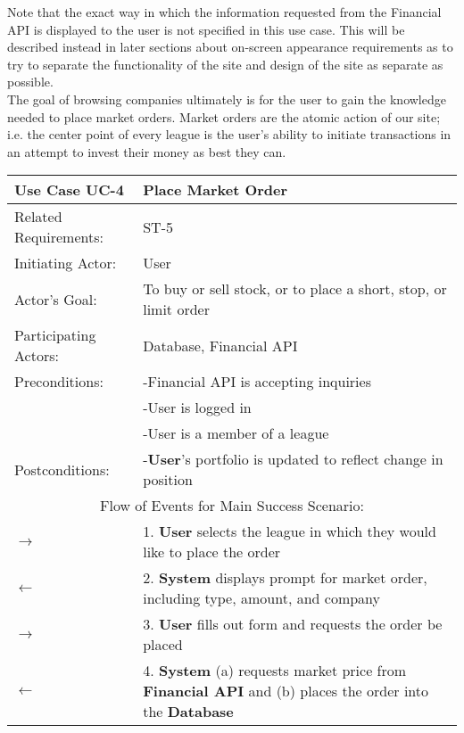 Note that the exact way in which the information requested from the Financial API is displayed to the user is not specified in this use case. This will be described instead in later sections about on-screen appearance requirements as to try to separate the functionality of the site and design of the site as separate as possible. \\

The goal of browsing companies ultimately is for the user to gain the knowledge needed to place market orders. Market orders are the atomic action of our site; i.e. the center point of every league is the user's ability to initiate transactions in an attempt to invest their money as best they can. \\

\begin{centering}
\renewcommand\arraystretch{1.3} %
\begin{longtable}{|p{1.2in} p{5in}|}
\hline
\bfseries{\color{color1}Use Case UC-4} & \bfseries{\color{color1}Place Market Order} \\
\hline
Related Requirements: & ST-5 \\ 
Initiating Actor:     & User \\
Actor's Goal:         & To buy or sell stock, or to place a short, stop, or limit order \\
Participating Actors:  & Database, Financial API \\
Preconditions:        & -Financial API is accepting inquiries \\
 & -User is logged in \\
 & -User is a member of a league \\
Postconditions:       & -\textbf{User}'s portfolio is updated to reflect change in position \\
\hline
\multicolumn{2}{|c|}{\color{color1}Flow of Events for Main Success Scenario:}\\
\hline
$\rightarrow$ & 1. \textbf{User} selects the league in which they would like to place the order \\
$\leftarrow$ & 2. \textbf{System} displays prompt for market order, including type, amount, and company \\
$\rightarrow$ & 3. \textbf{User} fills out form and requests the order be placed \\
$\leftarrow$ & 4. \textbf{System} (a) requests market price from \textbf{Financial API} and (b) places the order into the \textbf{Database} \\

\end{longtable}
\end{centering}
